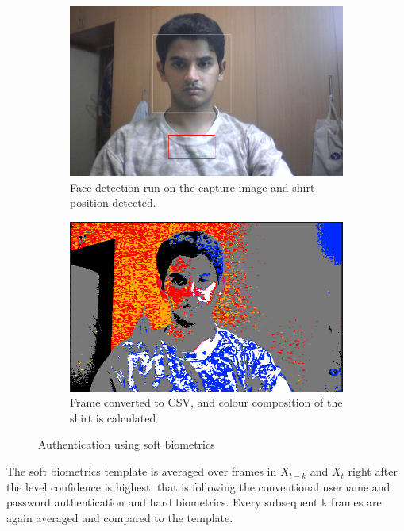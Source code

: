 \documentclass[12pt]{article}			%
\begin{document}
\begin{figure}[h!]
        \begin{subfigure}[b]{0.5\textwidth}
                \centering
                \includegraphics[scale=0.35]{img/soft2.png}
                \caption{Face detection run on the capture image and shirt position detected.}
                \label{fig:soft2_org}
        \end{subfigure}%
        \begin{subfigure}[b]{0.5\textwidth}
                \centering
                \includegraphics[scale=0.35]{img/soft2_csv.png}
                \caption{Frame converted to CSV, and colour composition of the shirt is calculated}
                \label{fig:soft2_csv}
        \end{subfigure}
        \caption{Authentication using soft biometrics}\label{fig:soft2}
\end{figure}

The soft biometrics template is averaged over frames in $X_{t-k}$ and $X_{t}$ right after the level confidence is highest, that is following the conventional username and password authentication and hard biometrics. Every subsequent k frames are again averaged and compared to the template. 
\end{document}

